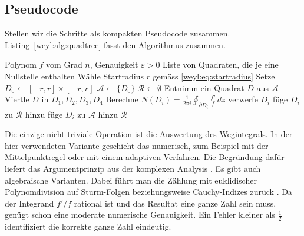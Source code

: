 \subsection{Pseudocode%
\label{weyl:subsection:pseudocode}}
%
Stellen wir die Schritte als kompakten Pseudocode zusammen.
Listing~\ref{weyl:alg:quadtree} fasst den Algorithmus zusammen.

\begin{algorithm}[!h]
\caption{Weyls Quadtree-Algorithmus\raisebox{1pt}{\strut}\label{weyl:alg:quadtree}}
\begin{algorithmic}[1]
\Require Polynom $f$ vom Grad $n$, Genauigkeit $\varepsilon > 0$
\Ensure Liste von Quadraten, die je eine Nullstelle enthalten
\State Wähle Startradius $r$ gemäss \eqref{weyl:eq:startradius}
\State Setze $D_0 \gets [-r,r] \times [-r,r]$
\State $\mathcal{A} \gets \{D_0\}$
\State $\mathcal{R} \gets \emptyset$
  \State Entnimm ein Quadrat $D$ aus $\mathcal{A}$
  \State Viertle $D$ in $D_1, D_2, D_3, D_4$
    \State Berechne $N(D_i) = \frac{1}{2\pi i} \oint_{\partial D_i} \frac{f'}{f}\, dz$
      \State verwerfe $D_i$
      \State füge $D_i$ zu $\mathcal{R}$ hinzu
    \Else
      \State füge $D_i$ zu $\mathcal{A}$ hinzu
    \EndIf
  \EndFor
\EndWhile
\State \Return $\mathcal{R}$
\end{algorithmic}
\end{algorithm}

Die einzige nicht-triviale Operation ist die Auswertung des Wegintegrals.
In der hier verwendeten Variante geschieht das numerisch, zum Beispiel mit der
Mittelpunktregel oder mit einem adaptiven Verfahren.
Die Begründung dafür liefert das Argumentprinzip aus der komplexen Analysis
\cite{weyl:eisermann}.
Es gibt auch algebraische Varianten.
Dabei führt man die Zählung mit euklidischer Polynomdivision auf Sturm-Folgen
beziehungsweise Cauchy-Indizes zurück \cite{weyl:stoer-bulirsch}.
Da der Integrand $f'/f$ rational ist und das Resultat eine ganze Zahl sein muss, genügt
schon eine moderate numerische Genauigkeit. Ein Fehler kleiner als $\tfrac{1}{2}$
identifiziert die korrekte ganze Zahl eindeutig.

